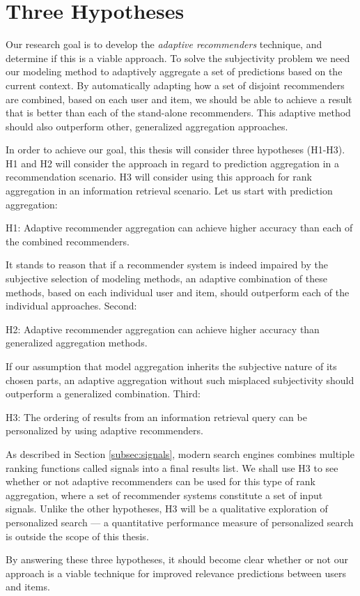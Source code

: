 \section{Three Hypotheses}
\label{sec:hypotheses}

Our research goal is to develop the \emph{adaptive recommenders} technique, and determine if this is a viable approach.
To solve the subjectivity problem we need our modeling method
to adaptively aggregate a set of predictions based on the current context.
By automatically adapting how a set of disjoint recommenders
are combined, based on each user and item, we should be able to achieve a
result that is better than each of the stand-alone recommenders.
This adaptive method should also outperform other, generalized aggregation approaches.

In order to achieve our goal, this thesis will consider three hypotheses (H1-H3).
H1 and H2 will consider the approach in regard to prediction aggregation
in a recommendation scenario. H3 will consider using this approach for
rank aggregation in an information retrieval scenario.
Let us start with prediction aggregation:

\begin{blockquote}
  H1: Adaptive recommender aggregation can achieve higher accuracy
  than each of the combined recommenders.
\end{blockquote}
%
It stands to reason that if a recommender system is indeed impaired
by the subjective selection of modeling methods,
an adaptive combination of these methods, based on each individual user and item, 
should outperform each of the individual approaches.
Second:

\begin{blockquote}
  H2: Adaptive recommender aggregation can achieve higher accuracy than generalized aggregation methods.
\end{blockquote}
%
If our assumption that model aggregation inherits the subjective nature of its chosen parts,
an adaptive aggregation without such misplaced subjectivity should outperform a
generalized combination.
Third:

\begin{blockquote}
  H3: The ordering of results from an information retrieval query
  can be personalized by using adaptive recommenders.
\end{blockquote}
%
As described in Section \ref{subsec:signals},
modern search engines combines multiple ranking functions called signals into a final results list.
We shall use H3 to see whether or not adaptive recommenders can be used for this type of rank aggregation,
where a set of recommender systems constitute a set of input signals.
Unlike the other hypotheses, H3 will be a qualitative exploration of personalized search ---
a quantitative performance measure of personalized search is outside the scope of this thesis.

By answering these three hypotheses, it should become clear whether or not
our approach is a viable technique for improved relevance predictions
between users and items.

